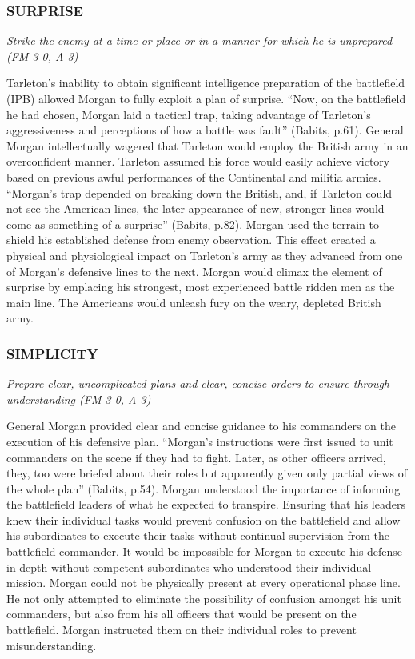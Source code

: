 \subsubsection{SURPRISE}

\textit{Strike the enemy at a time or place or in a manner for which he is
unprepared (FM 3-0, A-3)}

Tarleton’s inability to obtain significant intelligence preparation of the
battlefield (IPB) allowed Morgan to fully exploit a plan of surprise.   “Now,
on the battlefield he had chosen, Morgan laid a tactical trap, taking advantage
of Tarleton’s aggressiveness and perceptions of how a battle was fault”
(Babits, p.61).  General Morgan intellectually wagered that Tarleton would
employ the British army in an overconfident manner.  Tarleton assumed his force
would easily achieve victory based on previous awful performances of the
Continental and militia armies.  “Morgan’s trap depended on breaking down the
British, and, if Tarleton could not see the American lines, the later
appearance of new, stronger lines would come as something of a surprise”
(Babits, p.82).  Morgan used the terrain to shield his established defense from
enemy observation.  This effect created a physical and physiological impact on
Tarleton’s army as they advanced from one of Morgan’s defensive lines to the
next.  Morgan would climax the element of surprise by emplacing his strongest,
most experienced battle ridden men as the main line.  The Americans would
unleash fury on the weary, depleted British army.   

\subsubsection{SIMPLICITY}

\textit{Prepare clear, uncomplicated plans and clear, concise orders to ensure
through understanding (FM 3-0, A-3)}

General Morgan provided clear and concise guidance to his commanders on the
execution of his defensive plan.  “Morgan’s instructions were first issued to
unit commanders on the scene if they had to fight.  Later, as other officers
arrived, they, too were briefed about their roles but apparently given only
partial views of the whole plan” (Babits, p.54).  Morgan understood the
importance of informing the battlefield leaders of what he expected to
transpire.  Ensuring that his leaders knew their individual tasks would prevent
confusion on the battlefield and allow his subordinates to execute their tasks
without continual supervision from the battlefield commander.  It would be
impossible for Morgan to execute his defense in depth without competent
subordinates who understood their individual mission.  Morgan could not be
physically present at every operational phase line.  He not only attempted to
eliminate the possibility of confusion amongst his unit commanders, but also
from his all officers that would be present on the battlefield.  Morgan
instructed them on their individual roles to prevent misunderstanding.  

